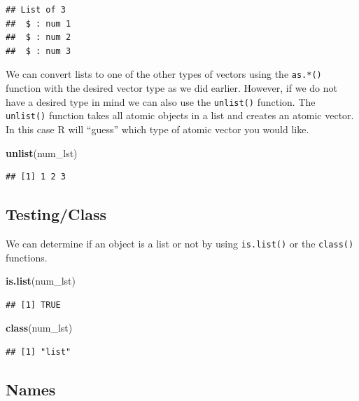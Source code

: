 \documentclass[
]{book}
\newenvironment{Shaded}{\begin{snugshade}}{\end{snugshade}}
\newcommand{\KeywordTok}[1]{\textcolor[rgb]{0.13,0.29,0.53}{\textbf{#1}}}
\newcommand{\NormalTok}[1]{#1}
\begin{document}
\begin{verbatim}
## List of 3
##  $ : num 1
##  $ : num 2
##  $ : num 3
\end{verbatim}

We can convert lists to one of the other types of vectors using the \texttt{as.*()} function with the desired vector type as we did earlier. However, if we do not have a desired type in mind we can also use the \texttt{unlist()} function. The \texttt{unlist()} function takes all atomic objects in a list and creates an atomic vector. In this case R will ``guess'' which type of atomic vector you would like.

\begin{Shaded}
\begin{Highlighting}[]
\KeywordTok{unlist}\NormalTok{(num_lst)}
\end{Highlighting}
\end{Shaded}

\begin{verbatim}
## [1] 1 2 3
\end{verbatim}

\hypertarget{testingclass-1}{%
\subsection{Testing/Class}\label{testingclass-1}}

We can determine if an object is a list or not by using \texttt{is.list()} or the \texttt{class()} functions.

\begin{Shaded}
\begin{Highlighting}[]
\KeywordTok{is.list}\NormalTok{(num_lst)}
\end{Highlighting}
\end{Shaded}

\begin{verbatim}
## [1] TRUE
\end{verbatim}

\begin{Shaded}
\begin{Highlighting}[]
\KeywordTok{class}\NormalTok{(num_lst)}
\end{Highlighting}
\end{Shaded}

\begin{verbatim}
## [1] "list"
\end{verbatim}

\hypertarget{names-2}{%
\subsection{Names}\label{names-2}}
\end{document}
